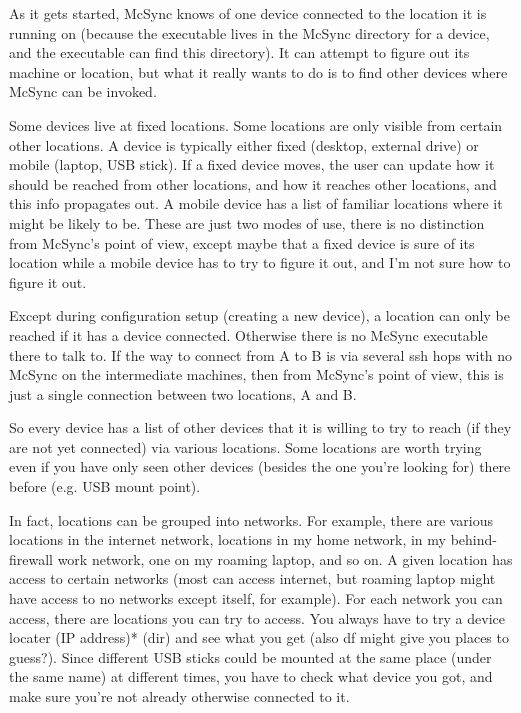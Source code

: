 \documentclass{book}
\begin{document}
As it gets started, McSync knows of one device connected to the location it is running on (because the executable lives in the McSync directory for a device, and the executable can find this directory).  It can attempt to figure out its machine or location, but what it really wants to do is to find other devices where McSync can be invoked.

Some devices live at fixed locations.  Some locations are only visible from certain other locations.  A device is typically either fixed (desktop, external drive) or mobile (laptop, USB stick).  If a fixed device moves, the user can update how it should be reached from other locations, and how it reaches other locations, and this info propagates out.  A mobile device has a list of familiar locations where it might be likely to be.  These are just two modes of use, there is no distinction from McSync's point of view, except maybe that a fixed device is sure of its location while a mobile device has to try to figure it out, and I'm not sure how to figure it out.

Except during configuration setup (creating a new device), a location can only be reached if it has a device connected.  Otherwise there is no McSync executable there to talk to.  If the way to connect from A to B is via several ssh hops with no McSync on the intermediate machines, then from McSync's point of view, this is just a single connection between two locations, A and B.

So every device has a list of other devices that it is willing to try to reach (if they are not yet connected) via various locations.  Some locations are worth trying even if you have only seen other devices (besides the one you're looking for) there before (e.g. USB mount point).

In fact, locations can be grouped into networks.  For example, there are various locations in the internet network, locations in my home network, in my behind-firewall work network, one on my roaming laptop, and so on.  A given location has access to certain networks (most can access internet, but roaming laptop might have access to no networks except itself, for example).  For each network you can access, there are locations you can try to access.  You always have to try a device locater (IP address)* (dir) and see what you get (also df might give you places to guess?).  Since different USB sticks could be mounted at the same place (under the same name) at different times, you have to check what device you got, and make sure you're not already otherwise connected to it.
\end{document}

